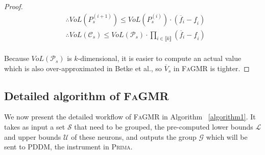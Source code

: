 \documentclass[runningheads]{llncs}
\newcommand{\ourtool}{\textsc{FaGMR}\xspace}
\newcommand{\prima}{\textsc{Prima}\xspace}
\begin{document}
\begin{proof}
\begin{equation*}
\begin{aligned}
&\therefore VoL(P^{(i+1)}_{s}) \leq VoL(P^{(i)}_{s}) \cdot (\overline{f}_{i}-\underline{f}_{i})\\
&\therefore VoL(\mathcal{C}_{s}) \leq VoL(\mathcal{P}_{s}) \cdot \prod_{i\in \llbracket  k \rrbracket}^{}(\overline{f}_{i} - \underline{f}_{i})
\end{aligned}
\end{equation*}
\\
Because $VoL(\mathcal{P}_{s})$ is $k$-dimensional, it is easier to compute an actual value which is also over-approximated in Betke et al., so $\overline{V}_{s}$ in \ourtool is tighter.

\end{proof}

%
%
%

\subsection{Detailed algorithm of \ourtool}\label{Subsec3.4}

We now present the detailed 
workflow of \ourtool in Algorithm ~\ref{algorithm1}.
It takes as input a set $\mathcal{S}$ that need to be grouped,
the pre-computed lower bounds $\mathcal{L}$ and upper bounds $\mathcal{U}$ of these neurons, and
outputs the group $\mathcal{G}$ which will be sent to PDDM, the instrument in \prima.
\end{document}
